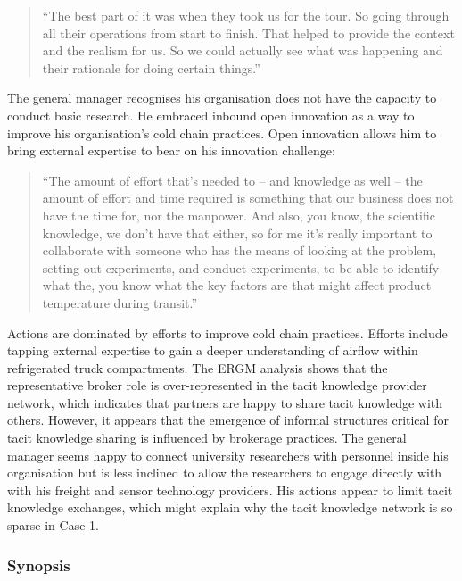 \begin{quote}
\small
\enquote{The best part of it was when they took us for the tour. So going through all their operations from start to finish. That helped to provide the context and the realism for us. So we could actually see what was happening and their rationale for doing certain things.} \\
\end{quote}

The general manager recognises his organisation does not have the capacity to conduct basic research. He embraced inbound open innovation as a way to improve his organisation's cold chain practices. Open innovation allows him to bring external expertise to bear on his innovation challenge:

\begin{quote}
\small
\enquote{The amount of effort that's needed to – and knowledge as well – the amount of effort and time required is something that our business does not have the time for, nor the manpower. And also, you know, the scientific knowledge, we don't have that either, so for me it's really important to collaborate with someone who has the means of looking at the problem, setting out experiments, and conduct experiments, to be able to identify what the, you know what the key factors are that might affect product temperature during transit.} \\
\end{quote}

Actions are dominated by efforts to improve cold chain practices. Efforts include tapping external expertise to gain a deeper understanding of airflow within refrigerated truck compartments. The ERGM analysis shows that the representative broker role is over-represented in the tacit knowledge provider network, which indicates that partners are happy to share tacit knowledge with others. However, it appears that the emergence of informal structures critical for tacit knowledge sharing is influenced by brokerage practices. The general manager seems happy to connect university researchers with personnel inside his organisation but is less inclined to allow the researchers to engage directly with with his freight and sensor technology providers. His actions appear to limit tacit knowledge exchanges, which might explain why the tacit knowledge network is so sparse in Case 1.

\subsubsection{Synopsis}


